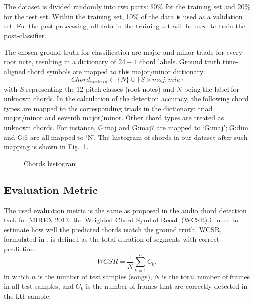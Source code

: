 \documentclass{article}
\begin{document}
The dataset is divided randomly into two parts: 80\% for the training set and 20\% for the test set. Within the training set, 10\% of the data is used as a validation set. For the post-processing, all data in the training set will be used to train the post-classifier.

The chosen ground truth for classification are major and minor triads for every root note, resulting in a dictionary of $24+1$ chord labels.
Ground truth time-aligned chord symbols are mapped to this major/minor dictionary:
\begin{equation}
Chord_{majmin} \subset \{N\} \cup \{S \times {maj,min}\}
\end{equation}
with $S$ representing the 12 pitch classes (root notes) and $N$ being the label for unknown chords. In the calculation of the detection accuracy, the following chord types are mapped to the corresponding triads in the dictionary: triad major/minor and seventh major/minor. Other chord types are treated as unknown chords. For instance, G:maj and G:maj7 are mapped to `G:maj'; G:dim and G:6 are all mapped to `N'. The histogram of chords in our dataset after such mapping is shown in Fig.~\ref{fig:distrib}. 
\begin{figure}
 \centerline{}
 \caption{Chords histogram}
 \label{fig:distrib}
\end{figure}

\subsection{Evaluation Metric}
The used evaluation metric is the same as proposed in the audio chord detection task for MIREX 2013: the Weighted Chord Symbol Recall (WCSR) is used to estimate how well the predicted chords match the ground truth. WCSR, formulated in , is defined as the total duration of segments with correct prediction:   
\begin{equation}\label{csr}
WCSR = \frac{1}{N} \sum_{k=1}^n C_{k},
\end{equation}
in which $n$ is the number of test samples (songs), $N$ is the total number of frames in all test samples, and $C_{k}$ is the number of frames that are correctly detected in the kth sample. 
\end{document}
